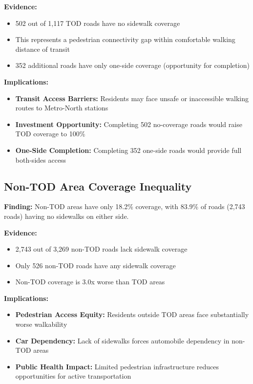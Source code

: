 \documentclass[11pt,letterpaper]{article}
\begin{document}
\textbf{Evidence:}
\begin{itemize}
    \item 502 out of 1,117 TOD roads have no sidewalk coverage
    \item This represents a pedestrian connectivity gap within comfortable walking distance of transit
    \item 352 additional roads have only one-side coverage (opportunity for completion)
\end{itemize}

\textbf{Implications:}
\begin{itemize}
    \item \textbf{Transit Access Barriers:} Residents may face unsafe or inaccessible walking routes to Metro-North stations
    \item \textbf{Investment Opportunity:} Completing 502 no-coverage roads would raise TOD coverage to 100\%
    \item \textbf{One-Side Completion:} Completing 352 one-side roads would provide full both-sides access
\end{itemize}

\subsection{Non-TOD Area Coverage Inequality}

\textbf{Finding:} Non-TOD areas have only 18.2\% coverage, with 83.9\% of roads (2,743 roads) having no sidewalks on either side.

\textbf{Evidence:}
\begin{itemize}
    \item 2,743 out of 3,269 non-TOD roads lack sidewalk coverage
    \item Only 526 non-TOD roads have any sidewalk coverage
    \item Non-TOD coverage is 3.0x worse than TOD areas
\end{itemize}

\textbf{Implications:}
\begin{itemize}
    \item \textbf{Pedestrian Access Equity:} Residents outside TOD areas face substantially worse walkability
    \item \textbf{Car Dependency:} Lack of sidewalks forces automobile dependency in non-TOD areas
    \item \textbf{Public Health Impact:} Limited pedestrian infrastructure reduces opportunities for active transportation
\end{itemize}
\end{document}

